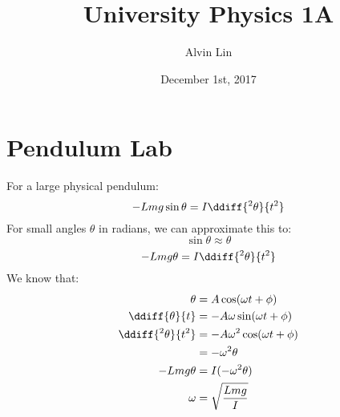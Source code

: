 \documentclass{math}
\title{University Physics 1A}
\author{Alvin Lin}
\date{December 1st, 2017}
\begin{document}
\maketitle

\section*{Pendulum Lab}
For a large physical pendulum:
\[ -Lmg\sin\theta = I\ddiff{^2\theta}{t^2} \]
For small angles \( \theta \) in radians, we can approximate this to:
\[ \sin\theta \approx \theta \]
\[ -Lmg\theta = I\ddiff{^2\theta}{t^2} \]
We know that:
\begin{align*}
  \theta &= A\cos(\omega t+\phi) \\
  \ddiff{\theta}{t} &= -A\omega\sin(\omega t+\phi) \\
  \ddiff{^2\theta}{t^2} &= -A\omega^2\cos(\omega t+\phi) \\
  &= -\omega^2\theta \\
  -Lmg\theta &= I(-\omega^2\theta) \\
  \omega &= \sqrt{\frac{Lmg}{I}}
\end{align*}
\end{document}
